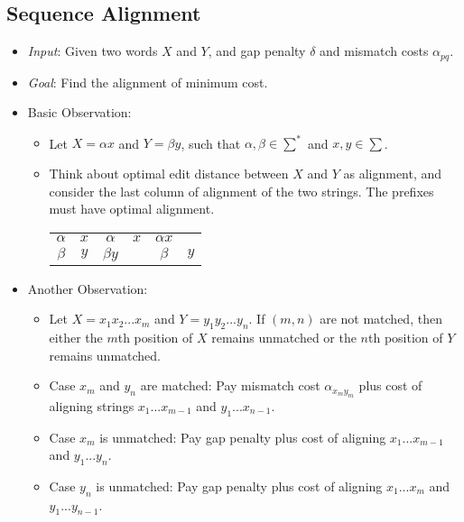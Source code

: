 \subsection{Sequence Alignment}
\begin{itemize}
    \item \textit{Input}: Given two words $X$ and $Y$, and gap penalty $\delta$ and mismatch costs $\alpha_{pq}$.
    \item \textit{Goal}: Find the alignment of minimum cost.
    \item Basic Observation:
    \begin{itemize}
        \item Let $X = \alpha x$ and $Y = \beta y$, such that $\alpha, \beta \in \sum^{\ast}$ and $x, y \in \sum$.
        \item Think about optimal edit distance between $X$ and $Y$ as alignment, and consider the last column of alignment of the two strings. The prefixes must have optimal alignment.
        \begin{center}
            \begin{tabular}{c c | c c | c c}
                $\alpha$ & $x$ & $\alpha$ & $x$ & $\alpha x$ & \\
                $\beta$ & $y$ & $\beta y$ &  & $\beta$ & $y$ \\
            \end{tabular}
        \end{center}
    \end{itemize}
    \item Another Observation:
    \begin{itemize}
        \item Let $X = x_1x_2...x_m$ and $Y = y_1y_2...y_n$. If $(m, n)$ are not matched, then either the $m$th position of $X$ remains unmatched or the $n$th position of $Y$ remains unmatched.
        \item Case $x_m$ and $y_n$ are matched: Pay mismatch cost $\alpha_{x_my_m}$ plus cost of aligning strings $x_1...x_{m-1}$ and $y_1...x_{n-1}$.
        \item Case $x_m$ is unmatched: Pay gap penalty plus cost of aligning $x_1...x_{m-1}$ and $y_1...y_n$.
        \item Case $y_n$ is unmatched: Pay gap penalty plus cost of aligning $x_1...x_m$ and $y_1...y_{n-1}$.
    \end{itemize}
\end{itemize}

